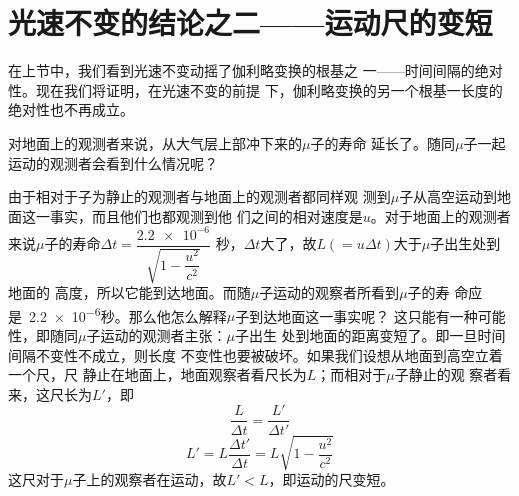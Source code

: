 \section{光速不变的结论之二——运动尺的变短}\label{sec:02.08}

在上节中，我们看到光速不变动摇了伽利略变换的根基之
一——时间间隔的绝对性。现在我们将证明，在光速不变的前提
下，伽利略变换的另一个根基一长度的绝对性也不再成立。

对地面上的观测者来说，从大气层上部冲下来的$ \mu $子的寿命
延长了。随同$ \mu $子一起运动的观测者会看到什么情况呢？

由于相对于子为静止的观测者与地面上的观测者都同样观
测到$ \mu $子从高空运动到地面这一事实，而且他们也都观测到他
们之间的相对速度是$u$。对于地面上的观测者来说$\mu$子的寿命$\Delta t = \dfrac{\num{2.2e-6}}{\sqrt{1 - \dfrac{u ^ 2}{c ^ 2}}}$
秒，$\Delta t$大了，故$ L \left( = u \Delta t \right)$大于$\mu$子出生处到地面的
高度，所以它能到达地面。而随$\mu$子运动的观察者所看到$\mu$子的寿
命应是~\num{2.2e-6}秒。那么他怎么解释$\mu$子到达地面这一事实呢？
这只能有一种可能性，即随同$\mu$子运动的观测者主张：$\mu$子出生
处到地面的距离变短了。即一旦时间间隔不变性不成立，则长度
不变性也要被破坏。如果我们设想从地面到高空立着一个尺，尺
静止在地面上，地面观察者看尺长为$L$；而相对于$\mu$子静止的观
察者看来，这尺长为$L'$，即
\begin{equation*}
  \frac { L } { \Delta t } = \frac { L ' } { \Delta t ' }
\end{equation*}
\begin{equation}\label{eqn:02.08.01}
  L ' = L \frac { \Delta t ' } { \Delta t } = L \sqrt { 1 - \frac { u ^ { 2 } } { c ^ { 2 } } }
\end{equation}
这尺对于$\mu$子上的观察者在运动，故$ L ' < L $，即运动的尺变短。

